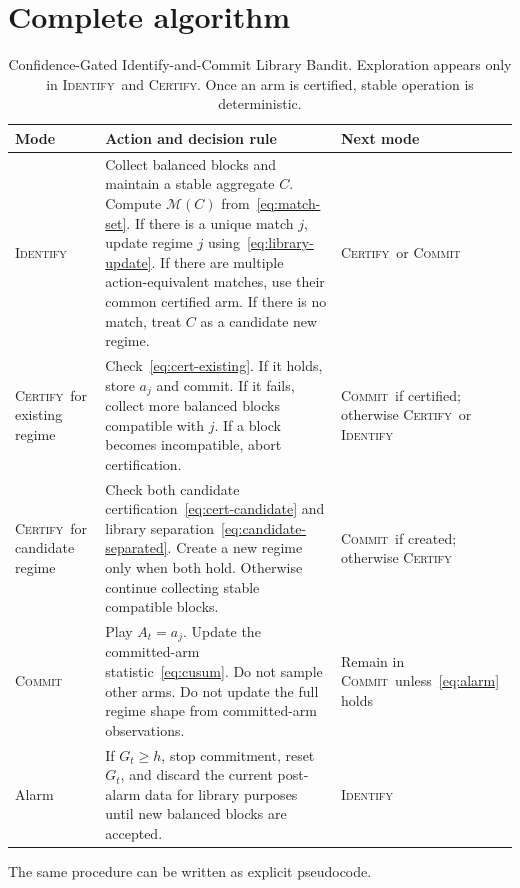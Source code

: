 \documentclass[11pt]{article}
\newcommand{\ID}{\textsc{Identify}}
\newcommand{\CERT}{\textsc{Certify}}
\newcommand{\COMMIT}{\textsc{Commit}}
\begin{document}
\section{Complete algorithm}

\begin{table}[t]
\centering
\small
\renewcommand{\arraystretch}{1.25}
\begin{tabularx}{\textwidth}{>{\raggedright\arraybackslash}p{} >{\raggedright\arraybackslash}X >{\raggedright\arraybackslash}p{}}
\toprule
\textbf{Mode} & \textbf{Action and decision rule} & \textbf{Next mode} \\
\midrule
\ID & Collect balanced blocks and maintain a stable aggregate $C$. Compute $\mathcal M(C)$ from~\eqref{eq:match-set}. If there is a unique match $j$, update regime $j$ using~\eqref{eq:library-update}. If there are multiple action-equivalent matches, use their common certified arm. If there is no match, treat $C$ as a candidate new regime. & \CERT\ or \COMMIT \\
\midrule
\CERT\ for existing regime & Check~\eqref{eq:cert-existing}. If it holds, store $a_j$ and commit. If it fails, collect more balanced blocks compatible with $j$. If a block becomes incompatible, abort certification. & \COMMIT\ if certified; otherwise \CERT\ or \ID \\
\midrule
\CERT\ for candidate regime & Check both candidate certification~\eqref{eq:cert-candidate} and library separation~\eqref{eq:candidate-separated}. Create a new regime only when both hold. Otherwise continue collecting stable compatible blocks. & \COMMIT\ if created; otherwise \CERT \\
\midrule
\COMMIT & Play $A_t=a_j$. Update the committed-arm statistic~\eqref{eq:cusum}. Do not sample other arms. Do not update the full regime shape from committed-arm observations. & Remain in \COMMIT\ unless~\eqref{eq:alarm} holds \\
\midrule
Alarm & If $G_t\geq h$, stop commitment, reset $G_t$, and discard the current post-alarm data for library purposes until new balanced blocks are accepted. & \ID \\
\bottomrule
\end{tabularx}
\caption{Confidence-Gated Identify-and-Commit Library Bandit. Exploration appears only in \ID\ and \CERT. Once an arm is certified, stable operation is deterministic.}
\label{tab:algorithm}
\end{table}

The same procedure can be written as explicit pseudocode.
\end{document}

